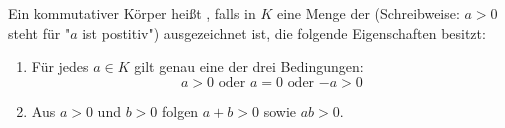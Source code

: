 Ein kommutativer Körper heißt , falls in $K$ eine Menge der  (Schreibweise: $a > 0$ steht für "$a$ ist postitiv") ausgezeichnet ist, die folgende Eigenschaften besitzt:

\begin{enumerate}

    \item Für jedes $a \in K$ gilt genau eine der drei Bedingungen:
    $$\text{$a > 0$ oder $a = 0$ oder $-a > 0$}$$

    \item Aus $a > 0$ und $b > 0$ folgen $a+b > 0$ sowie $ab > 0$.

\end{enumerate}